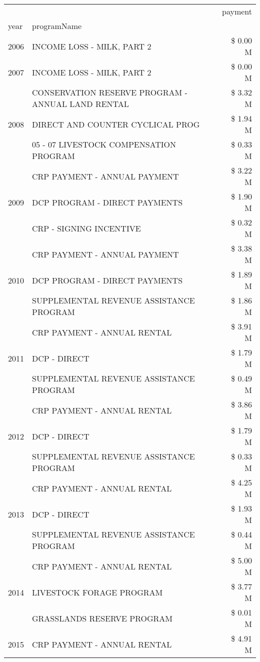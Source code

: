 \begin{tabular}{llr}
\toprule
 &  & payment \\
year & programName &  \\
\midrule
2006 & INCOME LOSS - MILK, PART 2 & \$ 0.00 M \\
\cline{1-3}
2007 & INCOME LOSS - MILK, PART 2 & \$ 0.00 M \\
\cline{1-3}
\multirow[t]{3}{*}{2008} & CONSERVATION RESERVE PROGRAM - ANNUAL LAND RENTAL & \$ 3.32 M \\
 & DIRECT AND COUNTER CYCLICAL PROG & \$ 1.94 M \\
 & 05 - 07 LIVESTOCK COMPENSATION PROGRAM & \$ 0.33 M \\
\cline{1-3}
\multirow[t]{3}{*}{2009} & CRP PAYMENT - ANNUAL PAYMENT & \$ 3.22 M \\
 & DCP PROGRAM - DIRECT PAYMENTS & \$ 1.90 M \\
 & CRP - SIGNING INCENTIVE & \$ 0.32 M \\
\cline{1-3}
\multirow[t]{3}{*}{2010} & CRP PAYMENT - ANNUAL PAYMENT & \$ 3.38 M \\
 & DCP PROGRAM - DIRECT PAYMENTS & \$ 1.89 M \\
 & SUPPLEMENTAL REVENUE ASSISTANCE PROGRAM & \$ 1.86 M \\
\cline{1-3}
\multirow[t]{3}{*}{2011} & CRP PAYMENT - ANNUAL RENTAL & \$ 3.91 M \\
 & DCP - DIRECT & \$ 1.79 M \\
 & SUPPLEMENTAL REVENUE ASSISTANCE PROGRAM & \$ 0.49 M \\
\cline{1-3}
\multirow[t]{3}{*}{2012} & CRP PAYMENT - ANNUAL RENTAL & \$ 3.86 M \\
 & DCP - DIRECT & \$ 1.79 M \\
 & SUPPLEMENTAL REVENUE ASSISTANCE PROGRAM & \$ 0.33 M \\
\cline{1-3}
\multirow[t]{3}{*}{2013} & CRP PAYMENT - ANNUAL RENTAL & \$ 4.25 M \\
 & DCP - DIRECT & \$ 1.93 M \\
 & SUPPLEMENTAL REVENUE ASSISTANCE PROGRAM & \$ 0.44 M \\
\cline{1-3}
\multirow[t]{3}{*}{2014} & CRP PAYMENT - ANNUAL RENTAL & \$ 5.00 M \\
 & LIVESTOCK FORAGE PROGRAM & \$ 3.77 M \\
 & GRASSLANDS RESERVE PROGRAM & \$ 0.01 M \\
\cline{1-3}
\multirow[t]{3}{*}{2015} & CRP PAYMENT - ANNUAL RENTAL & \$ 4.91 M \\

\end{tabular}
